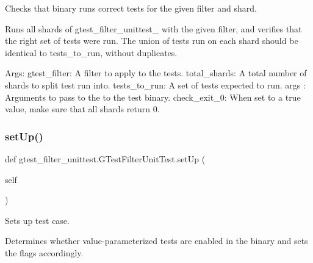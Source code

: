 \begin{DoxyVerb}Checks that binary runs correct tests for the given filter and shard.

Runs all shards of gtest_filter_unittest_ with the given filter, and
verifies that the right set of tests were run. The union of tests run
on each shard should be identical to tests_to_run, without duplicates.

Args:
  gtest_filter: A filter to apply to the tests.
  total_shards: A total number of shards to split test run into.
  tests_to_run: A set of tests expected to run.
  args   :      Arguments to pass to the to the test binary.
  check_exit_0: When set to a true value, make sure that all shards
            return 0.
\end{DoxyVerb}
 \mbox{\label{classgtest__filter__unittest_1_1_g_test_filter_unit_test_af20a71b1659314a5cc1093d77a673495}} 
\subsubsection{\texorpdfstring{set\+Up()}{setUp()}}
{\footnotesize\ttfamily def gtest\+\_\+filter\+\_\+unittest.\+G\+Test\+Filter\+Unit\+Test.\+set\+Up (\begin{DoxyParamCaption}\item[{}]{self }\end{DoxyParamCaption})}

\begin{DoxyVerb}Sets up test case.

Determines whether value-parameterized tests are enabled in the binary and
sets the flags accordingly.
\end{DoxyVerb}
 \mbox{\label{classgtest__filter__unittest_1_1_g_test_filter_unit_test_a2456062c177350a53244aea030aaf617}} 
